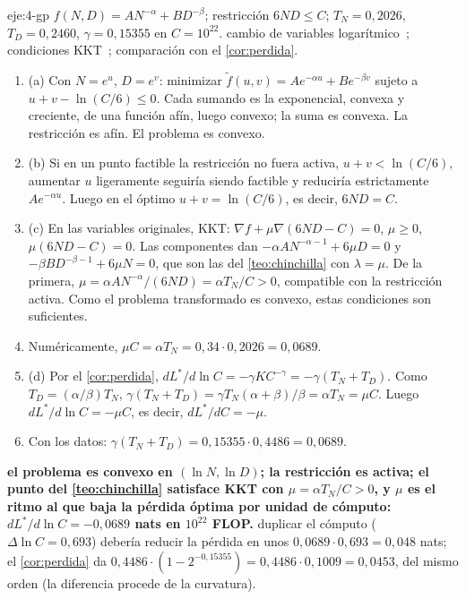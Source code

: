 \begin{solucion}{eje:4-gp}
\datos $f(N,D)=AN^{-\alpha}+BD^{-\beta}$; restricción $6ND\le C$; $T_N=0{,}2026$, $T_D=0{,}2460$, $\gamma=0{,}15355$ en $C=10^{22}$.
\planteamiento cambio de variables logarítmico~\cite[§4.5]{bv}; condiciones KKT~\cite[§5.5]{bv}; comparación con el \cref{cor:perdida}.
\pasos
\begin{enumerate}[label=\arabic*.]
  \item (a) Con $N=e^{u}$, $D=e^{v}$: minimizar $\tilde f(u,v)=Ae^{-\alpha u}+Be^{-\beta v}$ sujeto a $u+v-\ln(C/6)\le 0$. Cada sumando es la exponencial, convexa y creciente, de una función afín, luego convexo; la suma es convexa. La restricción es afín. El problema es convexo.
  \item (b) Si en un punto factible la restricción no fuera activa, $u+v<\ln(C/6)$, aumentar $u$ ligeramente seguiría siendo factible y reduciría estrictamente $Ae^{-\alpha u}$. Luego en el óptimo $u+v=\ln(C/6)$, es decir, $6ND=C$.
  \item (c) En las variables originales, KKT: $\nabla f+\mu\nabla(6ND-C)=0$, $\mu\ge 0$, $\mu(6ND-C)=0$. Las componentes dan $-\alpha AN^{-\alpha-1}+6\mu D=0$ y $-\beta BD^{-\beta-1}+6\mu N=0$, que son las del \cref{teo:chinchilla} con $\lambda=\mu$. De la primera, $\mu=\alpha AN^{-\alpha}/(6ND)=\alpha T_N/C>0$, compatible con la restricción activa. Como el problema transformado es convexo, estas condiciones son suficientes.
  \item Numéricamente, $\mu C=\alpha T_N=0{,}34\cdot 0{,}2026=0{,}0689$.
  \item (d) Por el \cref{cor:perdida}, $dL^{*}/d\ln C=-\gamma KC^{-\gamma}=-\gamma(T_N+T_D)$. Como $T_D=(\alpha/\beta)T_N$, $\gamma(T_N+T_D)=\gamma T_N(\alpha+\beta)/\beta=\alpha T_N=\mu C$. Luego $dL^{*}/d\ln C=-\mu C$, es decir, $dL^{*}/dC=-\mu$.
  \item Con los datos: $\gamma(T_N+T_D)=0{,}15355\cdot 0{,}4486=0{,}0689$.
\end{enumerate}
\resultado \textbf{el problema es convexo en $(\ln N,\ln D)$; la restricción es activa; el punto del \cref{teo:chinchilla} satisface KKT con $\mu=\alpha T_N/C>0$, y $\mu$ es el ritmo al que baja la pérdida óptima por unidad de cómputo: $dL^{*}/d\ln C=-0{,}0689$ nats en $10^{22}$ FLOP.}
\comprobacion duplicar el cómputo ($\Delta\ln C=0{,}693$) debería reducir la pérdida en unos $0{,}0689\cdot 0{,}693=0{,}048$ nats; el \cref{cor:perdida} da $0{,}4486\cdot(1-2^{-0{,}15355})=0{,}4486\cdot 0{,}1009=0{,}0453$, del mismo orden (la diferencia procede de la curvatura).
\end{solucion}

